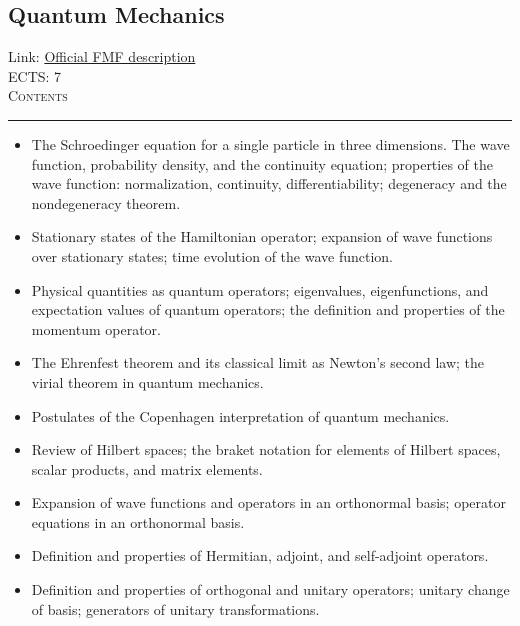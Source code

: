 \documentclass[11pt, a4paper]{article}
\newenvironment{course}[3]{
\subsection{#1}%
Link: \href{#2}{Official FMF description}\\%
ECTS: #3%
\vspace{1ex}
\\
{\large \textsc{Contents}}\\[-0.9ex]%
\rule{\textwidth}{0.5pt}
\vspace{-3ex}
}
{}
\newenvironment{chapter}[1]{
\begin{tcolorbox}[title=#1, breakable]
}
{\end{tcolorbox}}
\begin{document}
\begin{course}{Quantum Mechanics}{https://www.fmf.uni-lj.si/en/study-physics/programmes/1fiz/2020/7000777/courses/1156/}{7}
    \label{quantum_mechanics}

    \begin{chapter}{Fundamentals of quantum mechanics}
        \begin{itemize}
            \item The Schroedinger equation for a single particle in three dimensions. The wave function, probability density, and the continuity equation; properties of the wave function: normalization, continuity, differentiability; degeneracy and the nondegeneracy theorem.

            \item Stationary states of the Hamiltonian operator; expansion of wave functions over stationary states; time evolution of the wave function.

            \item Physical quantities as quantum operators; eigenvalues, eigenfunctions, and expectation values of quantum operators; the definition and properties of the momentum operator.

            \item The Ehrenfest theorem and its classical limit as Newton's second law; the virial theorem in quantum mechanics.

            
        \end{itemize}
    \end{chapter}

    \begin{chapter}{The Dirac formalism}
        \begin{itemize}

            \item Postulates of the Copenhagen interpretation of quantum mechanics.

            \item Review of Hilbert spaces; the braket notation for elements of Hilbert spaces, scalar products, and matrix elements.

            \item Expansion of wave functions and operators in an orthonormal basis; operator equations in an orthonormal basis.

            \item Definition and properties of Hermitian, adjoint, and self-adjoint operators.

            \item Definition and properties of orthogonal and unitary operators; unitary change of basis; generators of unitary transformations.


\end{itemize}
\end{chapter}
\end{course}
\end{document}
